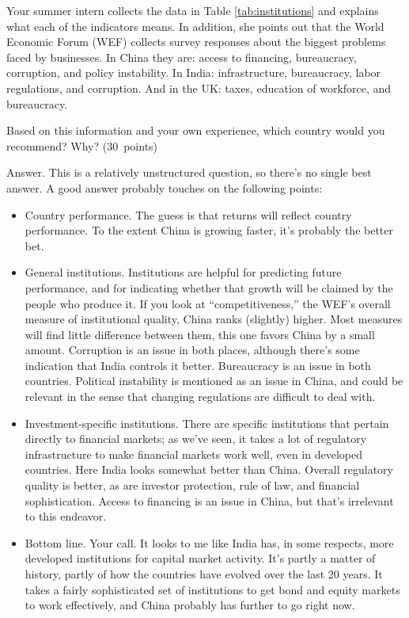 \documentclass[letterpaper,12pt]{article}
\begin{document}
\begin{enumerate}
Your summer intern collects the data in Table \ref{tab:institutions}
and explains what each of the indicators means.
In addition, she points out that 
the World Economic Forum (WEF) collects survey responses about 
the biggest problems faced by businesses. 
In China they are:  access to financing, bureaucracy, corruption, and policy instability.  
In India:  infrastructure, bureaucracy, labor regulations, and corruption. And in the UK:  taxes, education of workforce, and bureaucracy. 

Based on this information and your own experience, 
which country would you recommend? Why? 
(30~points) 


Answer.  This is a relatively unstructured question, 
so there's no single best answer.  
A good answer probably touches on the following points:
%
\begin{itemize}
\item Country performance. 
The guess is that returns will reflect country performance.
To the extent China is growing faster, 
it's probably the better bet.

\item General institutions. 
Institutions are helpful for predicting future performance, 
and for indicating whether that growth will be claimed
by the people who produce it.
If you look at ``competitiveness,'' the WEF's overall measure of 
institutional quality, China ranks (slightly) higher.    
Most measures will find little difference between them, 
this one favors China by a small amount.  
Corruption is an issue in both places, although there's 
some indication that India controls it better.  
Bureaucracy is an issue in both countries.  
Political instability is mentioned as an issue in China, 
and could be relevant in the sense that changing regulations
are difficult to deal with.  

\item Investment-specific institutions.  
There are specific institutions that pertain directly to financial 
markets; as we've seen, it takes a lot of regulatory infrastructure 
to make financial markets work well, even in developed countries.  
Here India looks somewhat better than China.  
Overall regulatory quality is better, 
as are investor protection, rule of law, and financial sophistication. Access to financing is an issue in China, 
but that's irrelevant to this endeavor.  

\item Bottom line.  Your call.
It looks to me like India has, in some respects, more developed 
institutions for capital market activity.
It's partly a matter of history, partly of how the countries
have evolved over the last 20 years.  
It takes a fairly sophisticated set of institutions to get 
bond and equity markets to work effectively, 
and China probably has further to go right now.  


\end{itemize}
\end{enumerate}
\end{document}

